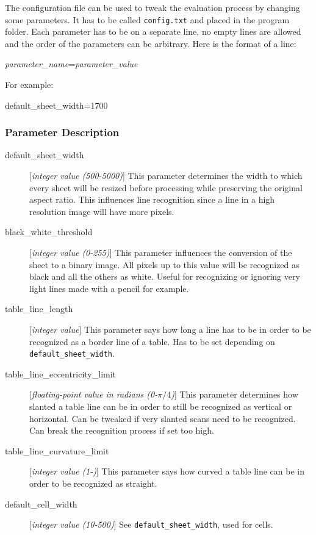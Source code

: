 \documentclass{article}
\begin{document}
{{	The configuration file can be used to tweak the evaluation process by changing some parameters. It has to be called \verb+config.txt+ and placed in the program folder. Each parameter has to be on a separate line, no empty lines are allowed and the order of the parameters can be arbitrary. Here is the format of a line:
	\begin{center}
	{\it parameter\_name}={\it parameter\_value} \par
	\end{center}
	
	For example:
	\begin{center}
	default\_sheet\_width=1700 \par
	\end{center}
	}

		\subsubsection{Parameter Description}{
			\begin{description}
				\item [default\_sheet\_width] [{\it integer value (500-5000)}] This parameter determines the width to which every sheet will be resized before processing while preserving the original aspect ratio. This influences line recognition since a line in a high resolution image will have more pixels.
				\item [black\_white\_threshold] [{\it integer value (0-255)}] This parameter influences the conversion of the sheet to a binary image. All pixels up to this value will be recognized as black and all the others as white. Useful for recognizing or ignoring very light lines made with a pencil for example.
				\item [table\_line\_length] [{\it integer value}] This parameter says how long a line has to be in order to be recognized as a border line of a table. Has to be set depending on \verb+default_sheet_width+.
				\item [table\_line\_eccentricity\_limit] [{\it floating-point value in radians (0-$\pi / 4$)}] This parameter determines how slanted a table line can be in order to still be recognized as vertical or horizontal. Can be tweaked if very slanted scans need to be recognized. Can break the recognition process if set too high.
				\item [table\_line\_curvature\_limit] [{\it integer value (1-)}] This parameter says how curved a table line can be in order to be recognized as straight.
				\item [default\_cell\_width] [{\it integer value (10-500)}] See \verb+default_sheet_width+, used for cells.

\end{description}}}
\end{document}
